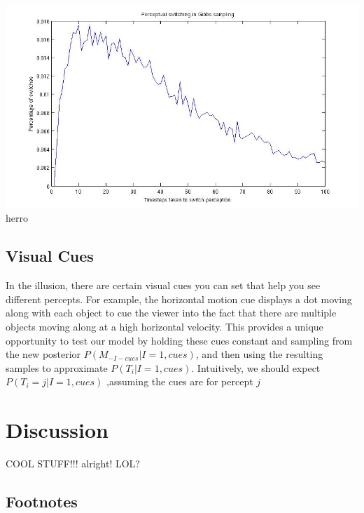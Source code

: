 \documentclass{article} %
\begin{document}
\includegraphics[scale=0.51]{1milUniformPfinal}
\small{herro}


\subsection{Visual Cues}
In the illusion, there are certain visual cues you can set that help you see different percepts. For example, the horizontal motion cue displays a dot moving along with each object to cue the viewer into the fact that there are multiple objects moving along at a high horizontal velocity. This provides a unique opportunity to test our model by holding these cues constant and sampling from the new posterior $P(M_{-I-cues}|I=1, cues)$, and then using the resulting samples to approximate $P(T_i|I=1, cues)$. Intuitively, we should expect $P(T_i = j|I=1, cues)$ ,assuming the cues are for percept $j$


\section{Discussion}

















\newpage

COOL \LaTeXe STUFF!!! alright! LOL?

\subsection{Footnotes}
\end{document}
